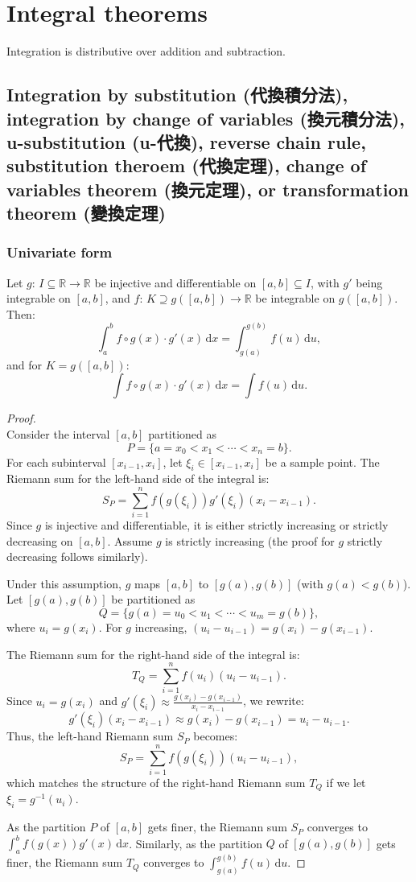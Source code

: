 \documentclass[a4paper,12pt]{report}
\begin{document}
\section{Integral theorems}
Integration is distributive over addition and subtraction.
\subsection{Integration by substitution (代換積分法), integration by change of variables (換元積分法), u-substitution (u-代換), reverse chain rule, substitution theroem (代換定理), change of variables theorem (換元定理), or transformation theorem (變換定理)}
\subsubsection{Univariate form}
Let $g:\,I\subseteq\mathbb{R}\to\mathbb{R}$ be injective and differentiable on $[a,b]\subseteq I$, with $g'$ being integrable on $[a,b]$, and $f:\,K\supseteq g([a,b])\to\mathbb{R}$ be integrable on $g([a,b])$. Then:
\[\int_a^bf\circ g(x)\cdot g'(x)\,\mathrm{d}x=\int_{g(a)}^{g(b)}f(u)\,\mathrm{d}u,\]
and for $K=g([a,b])$:
\[\int f\circ g(x)\cdot g'(x)\,\mathrm{d}x=\int f(u)\,\mathrm{d}u.\]
\begin{proof}\mbox{}\\
Consider the interval \([a, b]\) partitioned as
\[P = \{a = x_0 < x_1 < \cdots < x_n = b\}.\]
For each subinterval \([x_{i-1}, x_i]\), let \(\xi_i \in [x_{i-1}, x_i]\) be a sample point. The Riemann sum for the left-hand side of the integral is:
\[S_P = \sum_{i=1}^n f(g(\xi_i)) g'(\xi_i) (x_i - x_{i-1}).\]
Since \(g\) is injective and differentiable, it is either strictly increasing or strictly decreasing on \([a, b]\). Assume \(g\) is strictly increasing (the proof for \(g\) strictly decreasing follows similarly).

Under this assumption, \(g\) maps \([a, b]\) to \([g(a), g(b)]\) (with \(g(a) < g(b)\)). Let \([g(a), g(b)]\) be partitioned as
\[Q = \{g(a) = u_0 < u_1 < \cdots < u_m = g(b)\},\]
where \(u_i = g(x_i)\). For \(g\) increasing, \((u_i - u_{i-1}) = g(x_i) - g(x_{i-1})\).

The Riemann sum for the right-hand side of the integral is:
\[T_Q = \sum_{i=1}^n f(u_i) (u_i - u_{i-1}).\]
Since \(u_i = g(x_i)\) and \(g'(\xi_i) \approx \frac{g(x_i) - g(x_{i-1})}{x_i - x_{i-1}}\), we rewrite:
\[ g'(\xi_i) (x_i - x_{i-1}) \approx g(x_i) - g(x_{i-1}) = u_i - u_{i-1}. \]
Thus, the left-hand Riemann sum \(S_P\) becomes:
\[ S_P = \sum_{i=1}^n f(g(\xi_i)) (u_i - u_{i-1}),\]
which matches the structure of the right-hand Riemann sum \(T_Q\) if we let \(\xi_i = g^{-1}(u_i)\).

As the partition \(P\) of \([a, b]\) gets finer, the Riemann sum \(S_P\) converges to \(\int_a^b f(g(x)) g'(x) \, \mathrm{d}x\). Similarly, as the partition \(Q\) of \([g(a), g(b)]\) gets finer, the Riemann sum \(T_Q\) converges to \(\int_{g(a)}^{g(b)} f(u) \, \mathrm{d}u\).
\end{proof}
\end{document}
